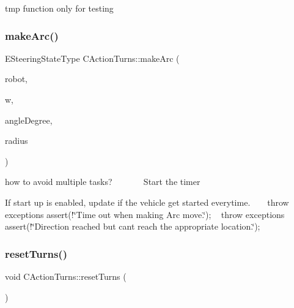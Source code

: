 tmp function only for testing \mbox{\label{classmotion_1_1CActionTurns_ae56d545164cc1931e3a86c1d5a4651b2}} 
\subsubsection{\texorpdfstring{make\+Arc()}{makeArc()}}
{\footnotesize\ttfamily E\+Steering\+State\+Type C\+Action\+Turns\+::make\+Arc (\begin{DoxyParamCaption}\item[{mrpt\+::kinematics\+::\+C\+Vehicle\+Simul\+\_\+\+Diff\+Driven $\ast$}]{robot,  }\item[{double}]{w,  }\item[{double}]{angle\+Degree,  }\item[{double}]{radius }\end{DoxyParamCaption})}

how to avoid multiple tasks? ~\newline
~\newline
~\newline
~\newline
 Start the timer

If start up is enabled, update if the vehicle get started everytime. ~\newline
~\newline
 throw exceptions assert(!\char`\"{}\+Time out when making Arc move.\char`\"{}); ~\newline
 throw exceptions assert(!\char`\"{}\+Direction reached but can\textquotesingle{}t reach the appropriate location.\char`\"{}); \mbox{\label{classmotion_1_1CActionTurns_aee91baac598ada2ef32e9ad25142c58c}} 
\subsubsection{\texorpdfstring{reset\+Turns()}{resetTurns()}}
{\footnotesize\ttfamily void C\+Action\+Turns\+::reset\+Turns (\begin{DoxyParamCaption}\item[{void}]{ }\end{DoxyParamCaption})}

